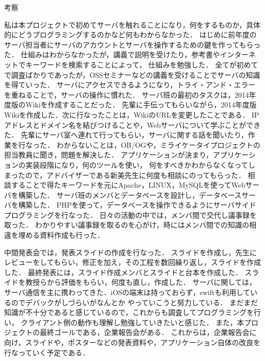 \par
考察
\par
私は本プロジェクトで初めてサーバを触れることになり，何をするものか，具体的にどうプログラミングするのかなど何もわからなかった．
はじめに前年度のサーバ担当者にサーバのアカウントとサーバを操作するための鍵を作ってもらった．
仕組みはわからなかったが，講義で説明を受けたり，参考書やインターネットでキーワードを検索することによって，
仕組みを勉強した．
全てが初めてで調査ばかりであったが，OSSセミナーなどの講義を受けることでサーバの知識を得ていった．
サーバにアクセスできるようになり，トライ・アンド・エラーを重ねることで，サーバの操作に慣れた．
サーバ班の最初のタスクは，2014年度版のWikiを作成することだった．
先輩に手伝ってもらいながら，2014年度版Wikiを作成した．次に行なったことは，WikiのURLを変更したことである．
IPアドレスとドメイン名を結びつけることや，Webサーバについて学ぶことができた．
先輩にサーバ室へ連れて行ってもらい，サーバに関する話を聞いたり，作業を行なった．
わからないことは，OB/OGや，ミライケータイプロジェクトの担当教員に聞き，問題を解決した．
アプリケーションが決まり，アプリケーションの実装段階になり，何のツールを使い，
何をすべきかわからなくなってしまったので，アドバイザーである新美先生に何度も相談にのってもらった．
相談することで得たキーワードを元にApache，LINUX，MySQLを使ってWebサーバを構築した．
サーバ班のメンバとデータベースを設計し，データベースサーバを構築した．
PHPを使って，データベースを操作できるようにサーバサイドプログラミングを行なった．
日々の活動の中では，メンバ間で交代し議事録を取った．
わかりやすい議事録を取るのを心がけ，時にはメンバ間での知識の相違を埋める資料作成も行った．
\par
中間発表会では，発表スライドの作成を行なった．
スライドを作成し，先生にレビューをしてもらい，修正を加え，その工程を数回繰り返し，スライドを作成した．
最終発表には，スライド作成メンバとスライドと台本を作成した．
スライドを教授らから評価をもらい，何度も直し，作成した．
サーバに関しては，サーバ通信を主に携わってきた．iOSの端末は持っておらず，swiftも利用しているのでデバックがしづらいがなんとか
やっていこうと努力している．
まだまだ知識が不十分であると感じているので，これからも調査してプログラミングを行い，
クライアント側の動作も理解し勉強していきたいと感じた．
また，本プロジェクトの最終ゴールである，企業報告会がある．
これからは，企業報告会に向け，スライドや，ポスターなどの発表資料や，アプリケーション自体の改良を行なっていく予定である．
\par
{}
